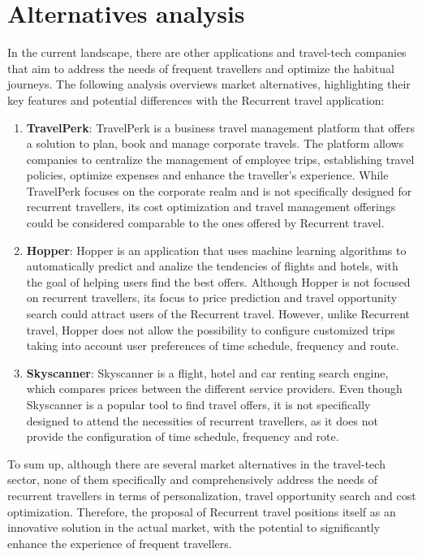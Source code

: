 \documentclass[../memory.tex]{subfiles}
\begin{document}
\section{Alternatives analysis}
In the current landscape, there are other applications and travel-tech companies
that aim to address the needs of frequent travellers and optimize the habitual
journeys. The following analysis overviews market alternatives, highlighting
their key features and potential differences with the Recurrent travel
application:
\begin{enumerate}[label = -]
	\item \textbf{TravelPerk}\cite{travel-perk}: TravelPerk is a business travel
	      management platform that offers a solution to plan, book and manage
	      corporate travels. The platform allows companies to centralize the
	      management of employee trips, establishing travel policies, optimize expenses
	      and enhance the traveller's experience. While TravelPerk focuses on the
	      corporate realm and is not specifically designed for recurrent travellers,
	      its cost optimization and travel management offerings could be considered
	      comparable to the ones offered by Recurrent travel.
	\item \textbf{Hopper}\cite{hopper}: Hopper is an application that uses machine
	      learning algorithms to automatically predict and analize the tendencies of
	      flights and hotels, with the goal of helping users find the best offers.
	      Although Hopper is not focused on recurrent travellers, its focus to price
	      prediction and travel opportunity search could attract users of the
	      Recurrent travel. However, unlike Recurrent travel, Hopper does not allow
	      the possibility to configure customized trips taking into account user
	      preferences of time schedule, frequency and route.
	\item \textbf{Skyscanner}\cite{skyscanner}: Skyscanner is a flight, hotel
	      and car renting search engine, which compares prices between the
	      different service providers. Even though Skyscanner is a popular tool
	      to find travel offers, it is not specifically designed to attend the
	      necessities of recurrent travellers, as it does not provide the
	      configuration of time schedule, frequency and rote.
\end{enumerate}
To sum up, although there are several market alternatives in the travel-tech
sector, none of them specifically and comprehensively address the needs of
recurrent travellers in terms of personalization, travel opportunity search and
cost optimization. Therefore, the proposal of Recurrent travel positions itself
as an innovative solution in the actual market, with the potential to
significantly enhance the experience of frequent travellers.
\end{document}
